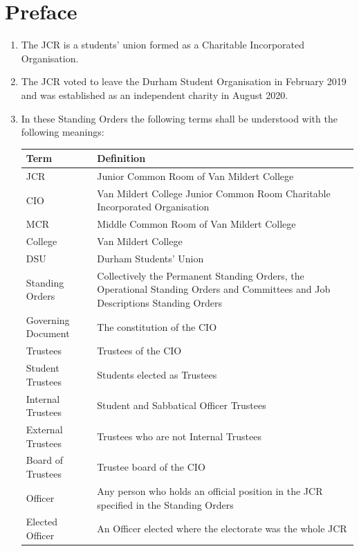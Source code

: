 \documentclass[12pt]{article}
\begin{document}
\section{Preface}
\begin{enumerate}
    \item The JCR is a students' union formed as a Charitable Incorporated Organisation.
    \item The JCR voted to leave the Durham Student Organisation in February 2019 and was established as an independent charity in August 2020.
    \item In these Standing Orders the following terms shall be understood with the following meanings:\\
\begin{tabular}{|p{1.5in}|p{3.8in}|}\hline
    \textbf{Term}           & \textbf{Definition}\\ \hline
    JCR                     & Junior Common Room of Van Mildert College\\ \hline
    CIO						& Van Mildert College Junior Common Room  Charitable Incorporated Organisation\\\hline
    MCR                     & Middle Common Room of Van Mildert College\\\hline
    College                 & Van Mildert College\\ \hline
    DSU                     & Durham Students' Union\\ \hline
    Standing Orders         & Collectively the Permanent Standing Orders, the Operational Standing Orders and Committees and Job Descriptions Standing Orders \\ \hline
    Governing Document      & The constitution of the CIO\\\hline
    Trustees				& Trustees of the CIO\\\hline
    Student Trustees		& Students elected as Trustees\\\hline
    Internal Trustees		& Student and Sabbatical Officer Trustees\\\hline
    External Trustees		& Trustees who are not Internal Trustees\\\hline
    Board of Trustees		& Trustee board of the CIO\\\hline
    Officer                 & Any person who holds an official position in the JCR specified in the Standing Orders\\ \hline
    Elected Officer         & An Officer elected where the electorate was the whole JCR \\ \hline

\end{tabular}
\end{enumerate}
\end{document}
